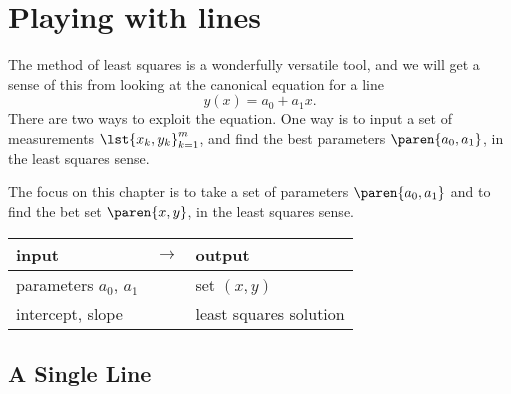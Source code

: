 \chapter{Playing with lines}

The method of least squares is a wonderfully versatile tool, and we will get a sense of this from looking at the canonical equation for a line
  \begin{equation*}   %
      y(x) = a_{0} + a_{1} x.
  \end{equation*}
There are two ways to exploit the equation. One way is to input a set of measurements $\lst{x_{k},y_{k}}_{k=1}^{m}$, and find the best parameters $\paren{a_{0},a_{1}}$, in the least squares sense. 

The focus on this chapter is to take a set of parameters $\paren{a_{0},a_{1}}$ and to find the bet set $\paren{x, y}$, in the least squares sense.	

\begin{table}[htbp]  %
    \begin{center}
        \begin{tabular}{lcl}
            input & $\rightarrow$ & output \\\hline
            parameters $a_{0}$, $a_{1}$ && set $(x, y)$\\
			intercept, slope && least squares solution
        \end{tabular}
    \end{center}
\end{table}%


\section{A Single Line}  %

